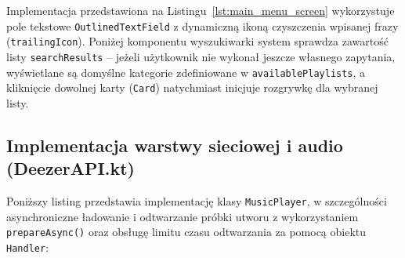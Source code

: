 \hspace{0.60cm}Implementacja przedstawiona na Listingu~\ref{lst:main_menu_screen} wykorzystuje pole tekstowe \texttt{OutlinedTextField} z dynamiczną ikoną czyszczenia wpisanej frazy (\texttt{trailingIcon}). Poniżej komponentu wyszukiwarki system sprawdza zawartość listy \texttt{searchResults} – jeżeli użytkownik nie wykonał jeszcze własnego zapytania, wyświetlane są domyślne kategorie zdefiniowane w \texttt{availablePlaylists}, a kliknięcie dowolnej karty (\texttt{Card}) natychmiast inicjuje rozgrywkę dla wybranej listy.

\subsection{Implementacja warstwy sieciowej i audio (DeezerAPI.kt)}

\hspace{0.60cm}Poniższy listing przedstawia implementację klasy \texttt{MusicPlayer}, w szczególności asynchroniczne ładowanie i odtwarzanie próbki utworu z wykorzystaniem \texttt{prepareAsync()} oraz obsługę limitu czasu odtwarzania za pomocą obiektu \texttt{Handler}:

